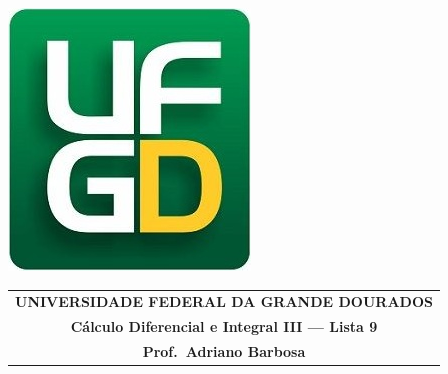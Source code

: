 \documentclass[a4paper,5pt]{amsbook}
\begin{document}
\thispagestyle{empty}
\pagestyle{empty}
\begin{minipage}[h]{0.14\textwidth}
	\includegraphics[scale=0.24]{../../ufgd.png}
\end{minipage}
\begin{minipage}[h]{\textwidth}
\begin{tabular}{c}
{{\bf UNIVERSIDADE FEDERAL DA GRANDE DOURADOS}}\\
{{\bf C\'alculo Diferencial e Integral III --- Lista 9}}\\
{{\bf Prof.\ Adriano Barbosa}}\\
\end{tabular}
\vspace{-0.45cm}
%
\end{minipage}

\end{document}
